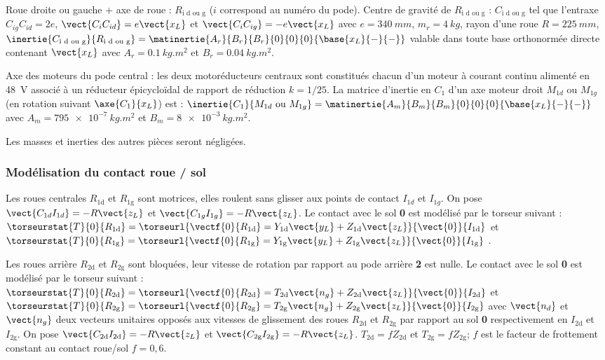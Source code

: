 Roue droite ou gauche + axe de roue : $R_{\text{i d ou g}}$ ($i$ correspond au numéro du pode).
Centre de gravité de $R_{\text{i d ou g}}$ : $C_{\text{i d ou g}}$ tel que l'entraxe ${C_{ig}C_{id}}=2e$, $\vect{C_{i}C_{id}}=e\vect{x_L}$ et $\vect{C_{i}C_{ig}}=-e\vect{x_L}$
avec $e=\SI{340}{mm}$, $m_{r}=\SI{4}{kg}$, rayon d'une roue $R=\SI{225}{mm}$, $\inertie{C_{\text{i d ou g}}}{R_{\text{i d ou g}}}=\matinertie{A_r}{B_r}{B_r}{0}{0}{0}{\base{x_L}{-}{-}}$ valable dans toute base orthonormée directe contenant $\vect{x_L}$ avec $A_r=\SI{0,1}{kg.m^2}$ et $B_r=\SI{0,04}{kg.m^2}$.


Axe des moteurs du pode central : les deux motoréducteurs centraux sont constitués chacun d’un moteur à courant continu alimenté en \SI{48}{V} associé à un réducteur épicycloïdal de rapport de réduction $k = 1/ 25$. La matrice d’inertie en $C_1$ d’un axe moteur droit $M_{1d}$ ou $M_{1g}$ (en rotation suivant $\axe{C_1}{x_L}$) est :
$\inertie{C_{1}}{M_{1d}\text{ ou } M_{1g}}=\matinertie{A_m}{B_m}{B_m}{0}{0}{0}{\base{x_L}{-}{-}}$
avec $A_m=\SI{795e-7}{kg.m^2}$ et $B_m=\SI{8e-3}{kg.m^2}$.

Les masses et inerties des autres pièces seront négligées.

\subsubsection*{Modélisation du contact roue / sol}

Les roues centrales $R_{\text{1d}}$ et $R_{\text{1g}}$ sont motrices, elles roulent sans glisser aux points de contact $I_{1d}$ et $I_{1g}$. On pose $\vect{C_{1d}I_{1d}}=-R\vect{z_L}$ et $\vect{C_{1g}I_{1g}}=-R\vect{z_L}$. 
Le contact avec le sol \textbf{0} est modélisé par le torseur suivant : 
$\torseurstat{T}{0}{R_{\text{1d}}}=\torseurl{\vectf{0}{R_{\text{1d}}} =Y_{\text{1d}}\vect{y_L}+Z_{\text{1d}}\vect{z_L} }{\vect{0}}{I_{\text{1d}}}$ et
$\torseurstat{T}{0}{R_{\text{1g}}}=\torseurl{\vectf{0}{R_{\text{1g}}} =Y_{\text{1g}}\vect{y_L}+Z_{\text{1g}}\vect{z_L} }{\vect{0}}{I_{\text{1g}}}$ .


Les roues arrière $R_{\text{2d}}$ et $R_{\text{2g}}$ sont bloquées, leur vitesse de rotation par rapport au pode arrière \textbf{2} est nulle. Le
contact avec le sol \textbf{0} est modélisé par le torseur suivant :
$\torseurstat{T}{0}{R_{\text{2d}}}=\torseurl{\vectf{0}{R_{\text{2d}}} =T_{\text{2d}}\vect{n_g}+Z_{\text{2d}}\vect{z_L} }{\vect{0}}{I_{\text{2d}}}$ et
$\torseurstat{T}{0}{R_{\text{2g}}}=\torseurl{\vectf{0}{R_{\text{2g}}} =T_{\text{2g}}\vect{n_g}+Z_{\text{2g}}\vect{z_L} }{\vect{0}}{I_{\text{2g}}}$  avec 
$\vect{n_d}$ et $\vect{n_g}$
deux vecteurs unitaires opposés aux vitesses de glissement des roues $R_{\text{2d}}$ et $R_{\text{2g}}$ par rapport au sol 
\textbf{0} respectivement en $I_{\text{2d}}$ et $I_{\text{2g}}$.
On pose $\vect{C_{\text{2d}}I_{\text{2d}}}=-R\vect{z_L}$
et $\vect{C_{\text{2g}}I_{\text{2g}}}=-R\vect{z_L}$.
$T_{\text{2d}}=fZ_{\text{2d}}$ et $T_{\text{2g}}=fZ_{\text{2g}}$; $f$ est le facteur de frottement constant au contact roue/sol $f=0,6$.

